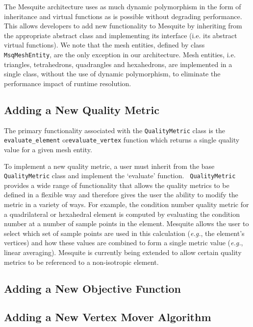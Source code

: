 \documentclass[letter]{report}
\begin{document}
The Mesquite architecture uses as much dynamic polymorphism in the
form of inheritance and virtual functions as is possible without
degrading performance.  This allows developers to add new
functionality to Mesquite by inheriting from the appropriate abstract
class and implementing its interface (i.e. its abstract virtual
functions).  We note that the mesh entities, defined by class {\tt
MsqMeshEntity}, are the only exception in our architecture.  Mesh
entities, i.e. triangles, tetrahedrons, quadrangles and hexahedrons,
are implemented in a single class, without the use of dynamic
polymorphism, to eliminate the performance impact of runtime
resolution.

\subsection{Adding a New Quality Metric} \label{sec:QualityMetricImpl}

The primary functionality associated with the {\tt QualityMetric}
class is the \texttt{evaluate\_element} or\texttt{evaluate\_vertex}  function which returns a single quality value
for a given mesh entity.

To implement a new quality metric, a user must inherit from the base
\texttt{QualityMetric} class and implement the `evaluate' function.
\texttt{ QualityMetric} provides a wide range of
functionality that allows the quality metrics to be defined in a
flexible way and therefore gives the user the ability to modify the
metric in a variety of ways.  For example, the condition number
quality metric for a quadrilateral or hexahedral element is computed
by evaluating the condition number at a number of sample points in the
element.  Mesquite allows the user to select which set of sample
points are used in this calculation ({\it e.g.}, the element's
vertices) and how these values are combined to form a single metric
value ({\it e.g.}, linear averaging).  Mesquite is currently being
extended to allow certain quality metrics to be referenced to a
non-isotropic element.

\subsection{Adding a New Objective Function}

\subsection{Adding a New Vertex Mover Algorithm}
\end{document}

